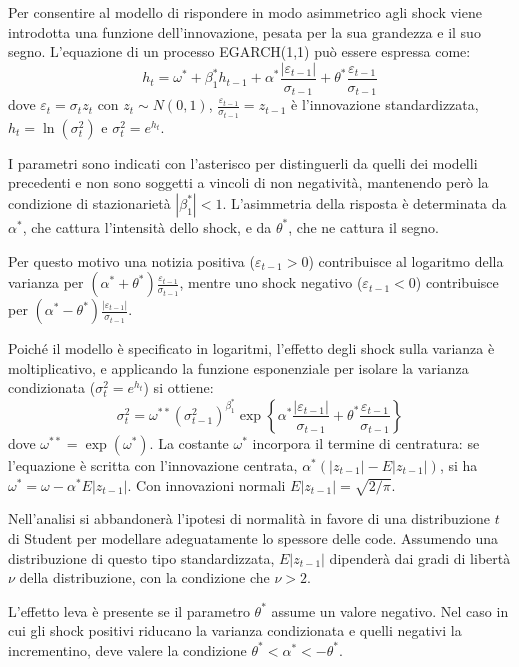 Per consentire al modello di rispondere in modo asimmetrico agli shock viene introdotta una funzione dell'innovazione, pesata per la sua grandezza e il suo segno. L'equazione di un processo EGARCH(1,1) può essere espressa come:
\[
    h_t = \omega^* + \beta_1^* h_{t-1} + \alpha^* \frac{|\varepsilon_{t-1}|}{\sigma_{t-1}} + \theta^* \frac{\varepsilon_{t-1}}{\sigma_{t-1}}
\]
dove $\varepsilon_t = \sigma_t z_t$ con $z_t \sim N(0,1)$, $\frac{\varepsilon_{t-1}}{\sigma_{t-1}} = z_{t-1}$ è l'innovazione standardizzata, $h_t = \ln(\sigma_t^2)$ e $\sigma_t^2 = e^{h_t}$.

I parametri sono indicati con l'asterisco per distinguerli da quelli dei modelli precedenti e non sono soggetti a vincoli di non negatività, mantenendo però la condizione di stazionarietà $|\beta_1^*| < 1$. 
L'asimmetria della risposta è determinata da $\alpha^*$, che cattura l'intensità dello shock, e da $\theta^*$, che ne cattura il segno. 

Per questo motivo una notizia positiva ($\varepsilon_{t-1} > 0$) contribuisce al logaritmo della varianza per $(\alpha^* + \theta^*) \frac{\varepsilon_{t-1}}{\sigma_{t-1}}$, mentre uno shock negativo ($\varepsilon_{t-1} < 0$) contribuisce per $(\alpha^* - \theta^*) \frac{|\varepsilon_{t-1}|}{\sigma_{t-1}}$.

Poiché il modello è specificato in logaritmi, l'effetto degli shock sulla varianza è moltiplicativo, e applicando la funzione esponenziale per isolare la varianza condizionata ($\sigma_t^2 = e^{h_t}$) si ottiene:
\[
    \sigma_t^2 = \omega^{**} (\sigma_{t-1}^2)^{\beta_1^*} \exp\left\{ \alpha^* \frac{|\varepsilon_{t-1}|}{\sigma_{t-1}} + \theta^* \frac{\varepsilon_{t-1}}{\sigma_{t-1}} \right\}
\]
dove $\omega^{**} = \exp(\omega^*)$. La costante $\omega^*$ incorpora il termine di centratura: se l'equazione è scritta con l'innovazione centrata, $\alpha^* (|z_{t-1}| - E|z_{t-1}|)$, si ha $\omega^* = \omega - \alpha^* E|z_{t-1}|$. Con innovazioni normali $E|z_{t-1}| = \sqrt{2/\pi}$.

Nell'analisi si abbandonerà l'ipotesi di normalità in favore di una distribuzione $t$ di Student per modellare adeguatamente lo spessore delle code. Assumendo una distribuzione di questo tipo standardizzata, $E|z_{t-1}|$ dipenderà dai gradi di libertà $\nu$ della distribuzione, con la condizione che $\nu > 2$.

L'effetto leva è presente se il parametro $\theta^*$ assume un valore negativo. Nel caso in cui gli shock positivi riducano la varianza condizionata e quelli negativi la incrementino, deve valere la condizione $\theta^* < \alpha^* < -\theta^*$.



